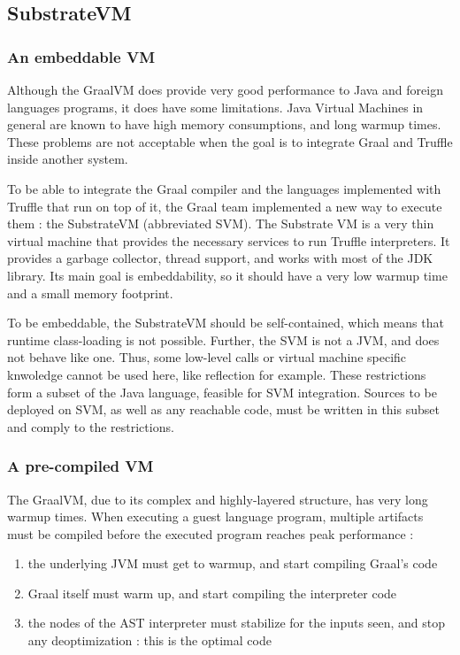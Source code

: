 \documentclass[twoside,11pt,a4paper]{article}
\begin{document}
\subsection{SubstrateVM}

\subsubsection{An embeddable VM}

Although the GraalVM does provide very good performance to Java and foreign languages programs, it does have some limitations. Java Virtual Machines in general are known to have high memory consumptions, and long warmup times. These problems are not acceptable when the goal is to integrate Graal and Truffle inside another system.

To be able to integrate the Graal compiler and the languages implemented with Truffle that run on top of it, the Graal team implemented a new way to execute them : the SubstrateVM (abbreviated SVM). The Substrate VM is a very thin virtual machine that provides the necessary services to run Truffle interpreters. It provides a garbage collector, thread support, and works with most of the JDK library. Its main goal is embeddability, so it should have a very low warmup time and a small memory footprint.

To be embeddable, the SubstrateVM should be self-contained, which means that runtime class-loading is not possible. Further, the SVM is not a JVM, and does not behave like one. Thus, some low-level calls or virtual machine specific knwoledge cannot be used here, like reflection for example. These restrictions form a subset of the Java language, feasible for SVM integration. Sources to be deployed on SVM, as well as any reachable code, must be written in this subset and comply to the restrictions.

\subsubsection{A pre-compiled VM}

The GraalVM, due to its complex and highly-layered structure, has very long warmup times. When executing a guest language program, multiple artifacts must be compiled before the executed program reaches peak performance :
\begin{enumerate}
\item the underlying JVM must get to warmup, and start compiling Graal's code
\item Graal itself must warm up, and start compiling the interpreter code
\item the nodes of the AST interpreter must stabilize for the inputs seen, and stop any deoptimization : this is the optimal code
\end{enumerate}
\end{document}

